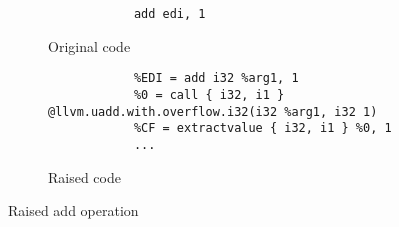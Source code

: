 \begin{figure}[htpb]
    \centering
    \begin{subfigure}[t]{\textwidth}
        \centering
        \begin{lstlisting}
            add edi, 1
        \end{lstlisting}
        \caption{Original code}
    \end{subfigure}
    \begin{subfigure}[t]{\textwidth}
        \centering
        \begin{lstlisting}
            %EDI = add i32 %arg1, 1
            %0 = call { i32, i1 } @llvm.uadd.with.overflow.i32(i32 %arg1, i32 1)
            %CF = extractvalue { i32, i1 } %0, 1
            ...
        \end{lstlisting}
        \caption{Raised code}
    \end{subfigure}
    \caption[Raised add operation]{Raised add operation}
    \label{fig:raised-add-op}
\end{figure}

